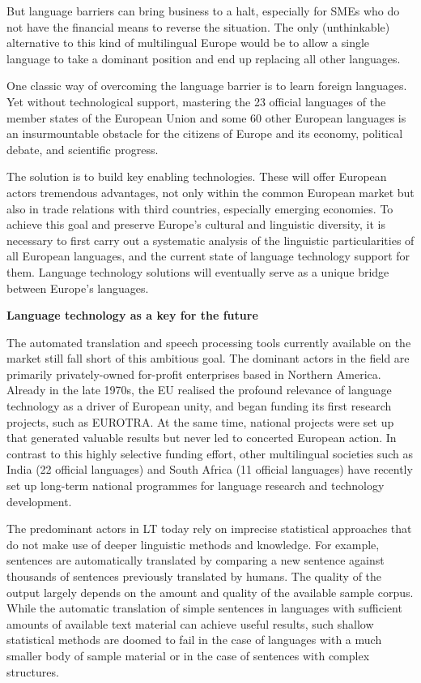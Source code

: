 \documentclass{scrartcl}
\newcommand{\boxtext}[1]{
  \begin{center}
    {\textbf{#1}}
  \end{center}
}
\begin{document}
\begin{Parallel}[c]{70mm}{70mm}
{    But language barriers can bring business to a halt, especially for SMEs who do not have the financial means to reverse the situation. The only (unthinkable) alternative to this kind of multilingual Europe would be to allow a single language to take a dominant position and end up replacing all other languages.

    One classic way of overcoming the language barrier is to learn foreign languages. Yet without technological support, mastering the 23 official languages of the member states of the European Union and some 60 other European languages is an insurmountable obstacle for the citizens of Europe and its economy, political debate, and scientific progress.

    The solution is to build key enabling technologies. These will offer European actors tremendous advantages, not only within the common European market but also in trade relations with third countries, especially emerging economies.  To achieve this goal and preserve Europe's cultural and linguistic diversity, it is necessary to first carry out a systematic analysis of the linguistic particularities of all European languages, and the current state of language technology support for them. Language technology solutions will eventually serve as a unique bridge between Europe's languages.


    \boxtext{Language technology as a key for the future}

    The automated translation and speech processing tools currently available on the market still fall short of this ambitious goal. The dominant actors in the field are primarily privately-owned for-profit enterprises based in Northern America. Already in the late 1970s, the EU realised the profound relevance of language technology as a driver of European unity, and began funding its first research projects, such as EUROTRA. At the same time, national projects were set up that generated valuable results but never led to concerted European action. In contrast to this highly selective funding effort, other multilingual societies such as India (22 official languages) and South Africa (11 official languages) have recently set up long-term national programmes for language research and technology development.

    The predominant actors in LT today rely on imprecise statistical approaches that do not make use of deeper linguistic methods and knowledge. For example, sentences are automatically translated by comparing a new sentence against thousands of sentences previously translated by humans. The quality of the output largely depends on the amount and quality of the available sample corpus. While the automatic translation of simple sentences in languages with sufficient amounts of available text material can achieve useful results, such shallow statistical methods are doomed to fail in the case of languages with a much smaller body of sample material or in the case of sentences with complex structures.

}
\end{Parallel}
\end{document}
